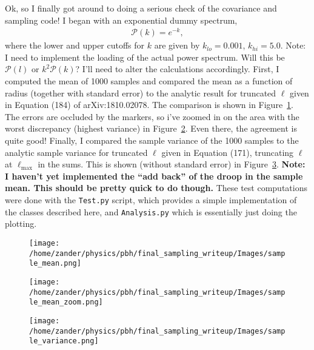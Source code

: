 \documentclass[10pt,a4paper]{article}
\begin{document}
Ok, so I finally got around to doing a serious check of the covariance and sampling code!
I began with an exponential dummy spectrum,
\begin{align}
\mathcal{P}(k) = e^{-k},
\end{align}
where the lower and upper cutoffs for $k$ are given by $k_{lo} = 0.001$, $k_{hi} = 5.0$. 
Note: I need to implement the loading of the actual power spectrum. Will this be $\mathcal{P}(l)$ or $k^2\mathcal{P}(k)$? I'll need to alter the calculations accordingly.
First, I computed the mean of 1000 samples and compared the mean as a function of radius (together with standard error) to the analytic result for truncated $\ell$ given in Equation (184) of arXiv:1810.02078. The comparison is shown in Figure~\ref{fig:samplemean}. The errors are occluded by the markers, so i've zoomed in on the area with the worst discrepancy (highest variance) in Figure~\ref{fig:samplemeanzoom}. Even there, the agreement is quite good! Finally, I compared the sample variance of the 1000 samples to the analytic sample variance for truncated $\ell$ given in Equation (171), truncating $\ell$ at $\ell_\text{max}$ in the sums. This is shown (without standard error) in Figure~\ref{fig:samplevariance}.
\textbf{Note: I haven't yet implemented the ``add back'' of the droop in the sample mean. This should be pretty quick to do though.}
These test computations were done with the \verb|Test.py| script, which provides a simple implementation of the classes described here, and \verb|Analysis.py| which is essentially just doing the plotting.

	\begin{figure}
		\centering
		\texttt{[image: /home/zander/physics/pbh/final\_sampling\_writeup/Images/sample\_mean.png]}
		\caption{}
		\label{fig:samplemean}
	\end{figure}
	\begin{figure}
		\centering
		\texttt{[image: /home/zander/physics/pbh/final\_sampling\_writeup/Images/sample\_mean\_zoom.png]}
		\caption{}
		\label{fig:samplemeanzoom}
	\end{figure}
	\begin{figure}
		\centering
		\texttt{[image: /home/zander/physics/pbh/final\_sampling\_writeup/Images/sample\_variance.png]}
		\caption{}
		\label{fig:samplevariance}
	\end{figure}
	
\end{document}
